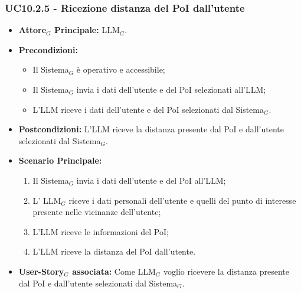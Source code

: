 \documentclass[10pt]{article}
\begin{document}
\begin{justify}
\subsubsection{\textbf{UC10.2.5 - Ricezione distanza del PoI dall'utente}}
\begin{itemize}
    \item \textbf{Attore$_G$ Principale:} LLM$_G$.
    \item \textbf{Precondizioni:} 
        \begin{itemize}
          \item Il Sistema$_G$ è operativo e accessibile;
          \item Il Sistema$_G$ invia i dati dell'utente e del PoI selezionati all'LLM;
            \item L'LLM riceve i dati dell'utente e del PoI selezionati dal Sistema$_G$.
        \end{itemize}
      \item \textbf{Postcondizioni:} L'LLM riceve la distanza presente dal PoI e dall'utente selezionati dal Sistema$_G$.
    \item \textbf{Scenario Principale:} 
        \begin{enumerate}
          \item Il Sistema$_G$ invia i dati dell'utente e del PoI all'LLM;
        \item L' LLM$_G$ riceve i dati personali dell'utente e quelli del punto di interesse presente nelle vicinanze dell'utente;
          \item L'LLM riceve le informazioni del PoI;
          \item L'LLM riceve la distanza del PoI dall'utente.
        \end{enumerate}
      \item \textbf{User-Story$_G$ associata:} Come LLM$_G$ voglio ricevere la distanza presente dal PoI e dall'utente selezionati dal Sistema$_G$.
\end{itemize}



\end{justify}
\end{document}
